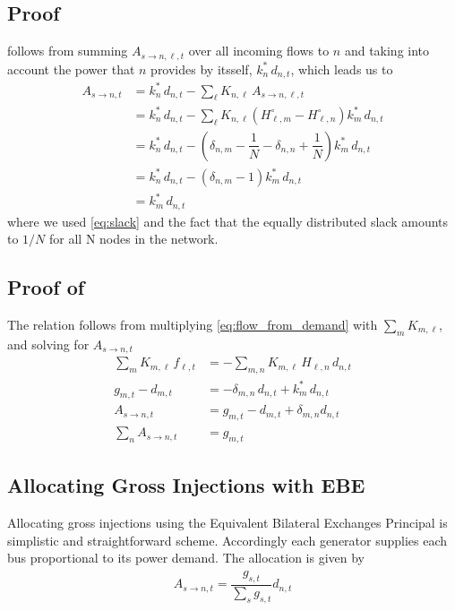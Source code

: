 \documentclass[11pt,twocolumn]{article}
\newcommand{\generation}{g_{s,t}}
\newcommand{\nodalgeneration}[1][n]{g_{#1,t}}
\newcommand{\demand}[1][n]{d_{#1,t}}
\newcommand{\nodaldemand}[1][n]{d_{#1,t}}
\newcommand{\incidence}[1][n]{K_{#1,\ell}}
\newcommand{\ptdf}[1][n]{H_{\ell,#1}}
\newcommand{\ptdfEqual}[1][n]{\ptdf[#1]^\circ}
\newcommand{\slackk}[1][n]{k^*_{#1}}
\newcommand{\flow}{f_{\ell,t}}
\newcommand{\allocatePeer}[1][s \rightarrow n]{A_{#1,t}}
\newcommand{\allocateTransaction}[1][s \rightarrow n]{A_{#1,\ell,t}}
\begin{document}
\subsection{\texorpdfstring{Proof }{First Proof}}
\label{sec:proof_allocate_peer}

 follows from summing $\allocateTransaction$ over all incoming flows to $n$ and taking into account the power that $n$ provides by itsself, $\slackk \, \nodaldemand$, which leads us to
\begin{align*}
\allocatePeer &= \slackk \, \nodaldemand - \sum_{\ell} \incidence \, \allocateTransaction \\
&= \slackk \, \nodaldemand - \sum_\ell \incidence \left(  \ptdfEqual[m] - \ptdfEqual \right) \slackk[m] \, \nodaldemand  \\
&= \slackk \, \nodaldemand - \left(  \delta_{n,m} - \dfrac{1}{N} - \delta_{n,n} + \dfrac{1}{N} \right) \slackk[m] \, \nodaldemand  \\
&= \slackk \, \nodaldemand - \left(  \delta_{n,m} - 1 \right) \slackk[m] \, \nodaldemand  \\
&= \slackk[m] \, \nodaldemand 
\end{align*}
where we used \cref{eq:slack} and the fact that the equally distributed slack amounts to $1/N$ for all N nodes in the network. 



\subsection{\texorpdfstring{Proof of }{Second proof}}
\label{sec:proof_sum_n_allocate_peer}
The relation follows from multiplying \cref{eq:flow_from_demand} with $\sum_m \incidence[m]$, and solving for $\allocatePeer$
\begin{align*}
\sum_m \incidence[m] \, \flow &= - \sum_{m,n} \incidence[m] \, \ptdf \, \nodaldemand \\
\nodalgeneration[m] - \nodaldemand[m] &= - \delta_{m,n} \, \nodaldemand + \slackk[m] \, \nodaldemand    \\
\allocatePeer &= \nodalgeneration[m] - \nodaldemand[m] + \delta_{m,n} \nodaldemand \\
\sum_n \allocatePeer &= \nodalgeneration[m]
\end{align*}

\subsection{Allocating Gross Injections with EBE}
\label{sec:gross_ebe}
Allocating gross injections using the Equivalent Bilateral Exchanges Principal is simplistic and straightforward scheme. Accordingly each generator supplies each bus proportional to its power demand. The allocation is given by 
\begin{align}
 \allocatePeer = \dfrac{\generation}{\sum_s \generation} \demand 
\end{align}
\end{document}
